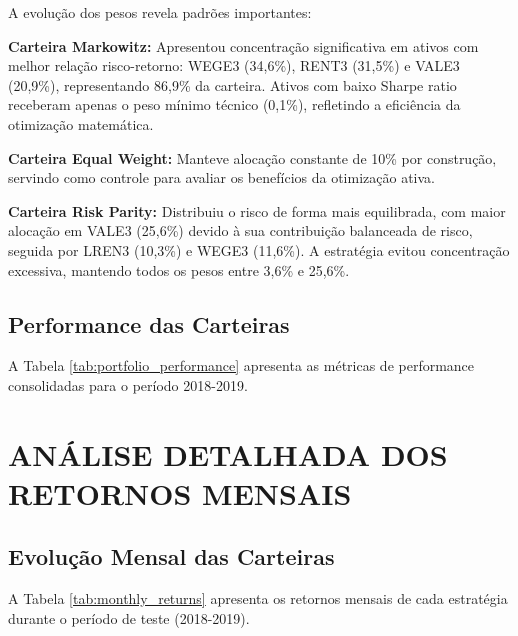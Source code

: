 A evolução dos pesos revela padrões importantes:

\textbf{Carteira Markowitz:} Apresentou concentração significativa em ativos com melhor relação risco-retorno: WEGE3 (34,6\%), RENT3 (31,5\%) e VALE3 (20,9\%), representando 86,9\% da carteira. Ativos com baixo Sharpe ratio receberam apenas o peso mínimo técnico (0,1\%), refletindo a eficiência da otimização matemática.

\textbf{Carteira Equal Weight:} Manteve alocação constante de 10\% por construção, servindo como controle para avaliar os benefícios da otimização ativa.

\textbf{Carteira Risk Parity:} Distribuiu o risco de forma mais equilibrada, com maior alocação em VALE3 (25,6\%) devido à sua contribuição balanceada de risco, seguida por LREN3 (10,3\%) e WEGE3 (11,6\%). A estratégia evitou concentração excessiva, mantendo todos os pesos entre 3,6\% e 25,6\%.

\subsection{Performance das Carteiras}

A Tabela \ref{tab:portfolio_performance} apresenta as métricas de performance consolidadas para o período 2018-2019.



\section{ANÁLISE DETALHADA DOS RETORNOS MENSAIS}

\subsection{Evolução Mensal das Carteiras}

A Tabela \ref{tab:monthly_returns} apresenta os retornos mensais de cada estratégia durante o período de teste (2018-2019).

